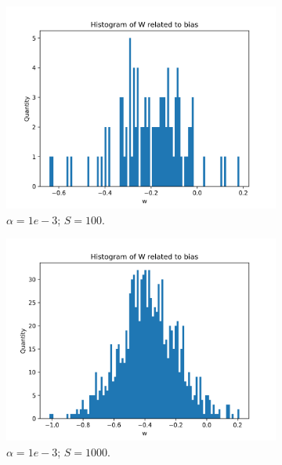 \documentclass{article}
\begin{document}
\begin{figure}
\begin{subfigure}[t]{0.24\textwidth}
    \includegraphics[width=\linewidth]{hist_featbias_10000_sample_100.png}
    \caption{$\alpha = 1e-3$; $S = 100$.}
  \end{subfigure}
  \hfill
  \begin{subfigure}[t]{0.24\textwidth}
    \centering
    \includegraphics[width=\linewidth]{hist_featbias_10000_sample_1000.png}
    \caption{$\alpha = 1e-3$; $S = 1000$.}
  \end{subfigure}
  \hfill
  \begin{subfigure}[t]{0.24\textwidth}
    \centering

\end{subfigure}
\end{figure}
\end{document}
